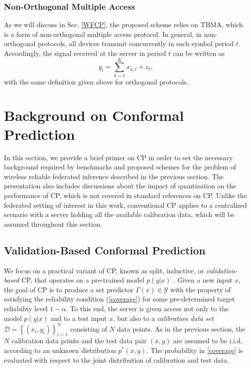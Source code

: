 \documentclass[12pt, draftclsnofoot, onecolumn]{IEEEtran}
\begin{document}
\subsubsection{Non-Orthogonal Multiple Access} As we will discuss in Sec. \ref{WFCP}, the proposed scheme relies on TBMA, which is a form of non-orthogonal multiple access protocol. In general, in non-orthogonal protocols, all devices transmit concurrently in each symbol period $t$. Accordingly, the signal received at the server in period $t$ can be written as
\begin{equation}\label{received_signal}
    y_t = \sum_{k=1}^K x_{k,t} + z_t,
\end{equation}
with the same definition given above for orthogonal protocols.

\section{Background on Conformal Prediction}\label{background_CP}
In this section, we provide a brief primer on CP in order to set the necessary background required by benchmarks and proposed schemes for the problem of wireless reliable federated inference described in the previous section. The presentation also includes discussions about the impact of quantization on the performance of CP, which is not covered in standard references on CP. Unlike the federated setting of interest in this work, conventional CP applies to a centralized scenario with a server holding all the available calibration data, which will be assumed throughout this section.

\subsection{Validation-Based Conformal Prediction}
We focus on a practical variant of CP, known as split, inductive, or \emph{validation-based} CP, that operates on a pre-trained model $p(y|x)$ \cite{vovk2005algorithmic, angelopoulos2021gentle, barber2021predictive}. Given a new input $x$, the goal of CP is to produce a set predictor $\Gamma(x)\in\mathcal{Y}$ with the property of satisfying the reliability condition (\ref{coverage}) for some pre-determined target reliability level $1-\alpha$. To this end, the server is given access not only to the model $p(y|x)$ and to a test input $x$, but also to a \emph{calibration data set } $\mathcal{D}=\left\{(x_i,y_i)\right\}_{i=1}^N$  consisting of $N$ data points. As in the previous section, the $N$ calibration data points and the test data pair $(x,y)$ are assumed to be i.i.d. according to an unknown distribution $p^*(x,y)$. The probability in \eqref{coverage} is evaluated with respect to the joint distribution of calibration and test data.
 
\end{document}
